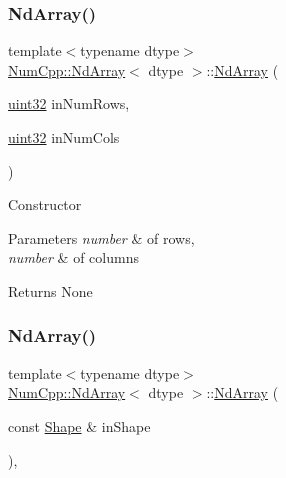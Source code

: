 \subsubsection{\texorpdfstring{Nd\+Array()}{NdArray()}\hspace{0.1cm}{\footnotesize\ttfamily [3/12]}}
{\footnotesize\ttfamily template$<$typename dtype$>$ \\
\mbox{\hyperlink{class_num_cpp_1_1_nd_array}{Num\+Cpp\+::\+Nd\+Array}}$<$ dtype $>$\+::\mbox{\hyperlink{class_num_cpp_1_1_nd_array}{Nd\+Array}} (\begin{DoxyParamCaption}\item[{\mbox{\hyperlink{namespace_num_cpp_a36f388e948380413c63011cab9b7fbd5}{uint32}}}]{in\+Num\+Rows,  }\item[{\mbox{\hyperlink{namespace_num_cpp_a36f388e948380413c63011cab9b7fbd5}{uint32}}}]{in\+Num\+Cols }\end{DoxyParamCaption})\hspace{0.3cm}{\ttfamily [inline]}}

Constructor


\begin{DoxyParams}{Parameters}
{\em number} & of rows, \\
\hline
{\em number} & of columns \\
\hline
\end{DoxyParams}
\begin{DoxyReturn}{Returns}
None 
\end{DoxyReturn}
\mbox{\label{class_num_cpp_1_1_nd_array_a191657f4184d31a931678ef8e0b54387}} 
\subsubsection{\texorpdfstring{Nd\+Array()}{NdArray()}\hspace{0.1cm}{\footnotesize\ttfamily [4/12]}}
{\footnotesize\ttfamily template$<$typename dtype$>$ \\
\mbox{\hyperlink{class_num_cpp_1_1_nd_array}{Num\+Cpp\+::\+Nd\+Array}}$<$ dtype $>$\+::\mbox{\hyperlink{class_num_cpp_1_1_nd_array}{Nd\+Array}} (\begin{DoxyParamCaption}\item[{const \mbox{\hyperlink{class_num_cpp_1_1_shape}{Shape}} \&}]{in\+Shape }\end{DoxyParamCaption})\hspace{0.3cm}{\ttfamily [inline]}, {\ttfamily [explicit]}}

